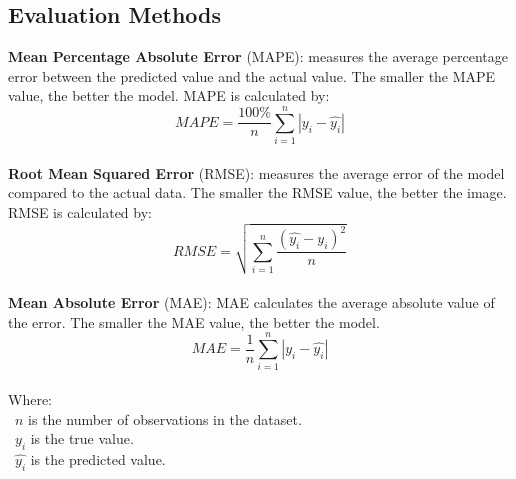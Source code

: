 \documentclass{ieeeojies}
\begin{document}
\subsection{Evaluation Methods}
\textbf{Mean Percentage Absolute Error} (MAPE): measures the average percentage error between the predicted value and the actual value. The smaller the MAPE value, the better the model. MAPE is calculated by:
\[MAPE=\frac{100\%}{n}  \sum_{i=1}^{n} |y_i-\hat{y_i} | \]\\
\textbf{Root Mean Squared Error} (RMSE): measures the average error of the model compared to the actual data. The smaller the RMSE value, the better the image. RMSE is calculated by:
\[RMSE=\sqrt{\sum_{i=1}^{n} \frac{(\hat{y_i}-y_i )^2}{n} }\]\\
\textbf{Mean Absolute Error} (MAE): MAE calculates the average absolute value of the error. The smaller the MAE value, the better the model.
\[MAE=\frac{1}{n} \sum_{i=1}^{n} |y_i-\hat{y_i}|\]\\
Where: \\
	\indent\textbullet\ \(n\) is the number of observations in the dataset.\\
	\indent\textbullet\ \(y_i\)  is the true value.\\
	\indent\textbullet\ \(\hat{y_i}\) is the predicted value.
\end{document}
